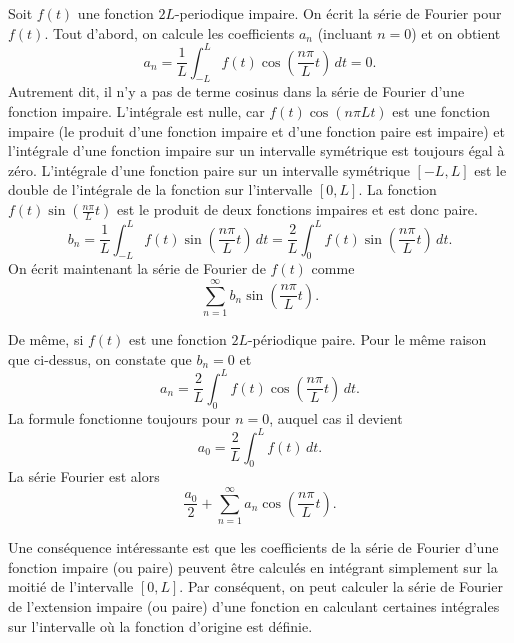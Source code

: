 Soit $f(t)$ une fonction $2L$-periodique impaire.  On écrit
la série de Fourier pour $ f (t) $. Tout d'abord, on calcule les coefficients $a_n$ (incluant
$n=0$) et on obtient
\begin{equation*}
a_n = \frac{1}{L} \int_{-L}^L f(t) \cos \left( \frac{n \pi}{L} t \right)
\, dt = 0 .
\end{equation*}
Autrement dit, il n'y a pas de terme cosinus dans la série de Fourier d'une fonction impaire.
L'intégrale est nulle, car $f(t) \cos \left( {n \pi}{L} t \right)$
est une fonction impaire (le produit d'une fonction impaire et d'une
fonction paire est impaire) et l'intégrale d'une fonction impaire sur un intervalle symétrique est toujours égal à zéro. L'intégrale d'une fonction paire sur un intervalle symétrique
$[-L,L]$  est le double de l'intégrale de la fonction sur l'intervalle $[0,L]$.
La fonction $f(t) \sin \left( \frac{n \pi}{L} t \right)$ est le produit de deux fonctions impaires
et est donc paire.
\begin{equation*}
b_n = 
\frac{1}{L} \int_{-L}^L f(t) \sin \left( \frac{n \pi}{L} t \right) \, dt =
\frac{2}{L} \int_{0}^L f(t) \sin \left( \frac{n \pi}{L} t \right) \, dt .
\end{equation*}
On écrit maintenant la série de Fourier de $f(t)$ comme
\begin{equation*}
\sum_{n=1}^\infty b_n \sin \left( \frac{n \pi}{L} t \right) .
\end{equation*}

De même, si $f(t)$ est une fonction  $2L$-périodique paire.  Pour le même 
raison que ci-dessus, on constate que $b_n = 0$ et
\begin{equation*}
a_n = 
\frac{2}{L} \int_{0}^L f(t) \cos \left( \frac{n \pi}{L} t \right) \, dt .
\end{equation*}
La formule fonctionne toujours pour $n=0$, auquel cas il devient
\begin{equation*}
a_0 = 
\frac{2}{L} \int_{0}^L f(t) \, dt .
\end{equation*}
La série Fourier est alors
\begin{equation*}
\frac{a_0}{2}
+
\sum_{n=1}^\infty a_n \cos \left( \frac{n \pi}{L} t \right) .
\end{equation*}

Une conséquence intéressante est que les coefficients de la série de Fourier d'une fonction impaire (ou paire) peuvent être calculés en intégrant simplement sur la moitié de l'intervalle $[0,L]$.  Par conséquent, on peut calculer la série de Fourier de
l'extension impaire (ou paire) d'une fonction en calculant certaines intégrales sur l'intervalle
où la fonction d'origine est définie.

